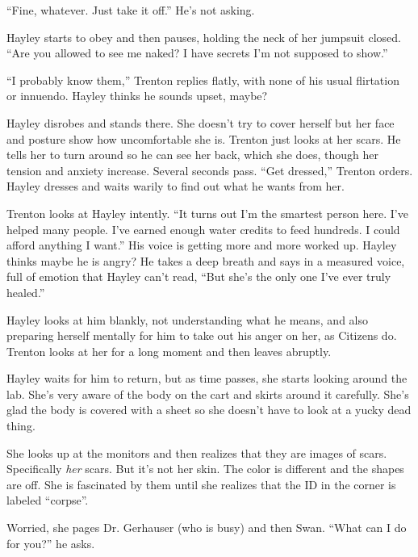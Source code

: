 ``Fine, whatever.  Just take it off.''  He's not asking.

Hayley starts to obey and then pauses, holding the neck of her jumpsuit closed.  ``Are you allowed to see me naked?  I have secrets I'm not supposed to show.'' 

``I probably know them,'' Trenton replies flatly, with none of his usual flirtation or innuendo.  Hayley thinks he sounds upset, maybe?

Hayley disrobes and stands there.  She doesn't try to cover herself but her face and posture show how uncomfortable she is.  Trenton just looks at her scars.  He tells her to turn around so he can see her back, which she does, though her tension and anxiety increase.  Several seconds pass.  ``Get dressed,'' Trenton orders.  Hayley dresses and waits warily to find out what he wants from her.



Trenton looks at Hayley intently.  ``It turns out I'm the smartest person here.  I've helped many people.  I've earned enough water credits to feed hundreds.  I could afford anything I want.''  His voice is getting more and more worked up.  Hayley thinks maybe he is angry?  He takes a deep breath and says in a measured voice, full of emotion that Hayley can't read, ``But she's the only one I've ever truly healed.''



Hayley looks at him blankly, not understanding what he means, and also preparing herself mentally for him to take out his anger on her, as Citizens do.  Trenton looks at her for a long moment and then leaves abruptly.



Hayley waits for him to return, but as time passes, she starts looking around the lab.  She's very aware of the body on the cart and skirts around it carefully.   She's glad the body is covered with a sheet so she doesn't have to look at a yucky dead thing.



She looks up at the monitors and then realizes that they are images of scars.  Specifically \textit{her} scars.  But it's not her skin.  The color is different and the shapes are off.  She is fascinated by them until she realizes that the ID in the corner is labeled ``corpse''.



Worried, she pages Dr. Gerhauser (who is busy) and then Swan.  ``What can I do for you?'' he asks.

